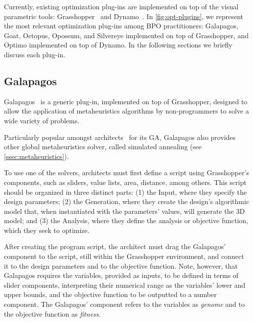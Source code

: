 	Currently, existing optimization plug-ins are implemented on top of the visual parametric tools: Grasshopper~\cite{GRASSHOPPER} and Dynamo~\cite{DYNAMOBIM}. In \cref{fig:opt-plugins}, we represent the most relevant optimization plug-ins among \ac{BPO} practitioners: Galapagos, Goat, Octopus, Opossum, and Silvereye implemented on top of Grasshopper, and Optimo implemented on top of Dynamo. In the following sections we briefly discuss each plug-in.
	
	
	\subsection{Galapagos}
	\label{subsec:galapagos}
	Galapagos~\cite{GALAPAGOS} is a generic plug-in, implemented on top of Grasshopper, designed to allow the application of metaheuristics algorithms by non-programmers to solve a wide variety of problems. 
	
	Particularly popular amongst architects~\cite{Wortmann2017ADO} for its \ac{GA}, Galapagos also provides other global metaheuristics solver, called simulated annealing (see \cref{ssec:metaheuristics}). 
	
	To use one of the solvers, architects must first define a script using Grasshopper's components, such as sliders, value lists, area, distance, among others. This script should be organized in three distinct parts: (1) the Input, where they specify the design parameters; (2) the Generation, where they create the design's algorithmic model that, when instantiated with the parameters' values, will generate the 3D model; and (3) the Analysis, where they define the analysis or objective function, which they seek to optimize. 
	
	After creating the program script, the architect must drag the Galapagos' component to the script, still within the Grasshopper environment, and connect it to the design parameters and to the objective function. Note, however, that Galapagos requires the variables, provided as inputs, to be defined in terms of slider components, interpreting their numerical range as the variables' lower and upper bounds, and the objective function to be outputted to a number component. The Galapagos' component refers to the variables as \textit{genome} and to the objective function as \textit{fitness}.
	
